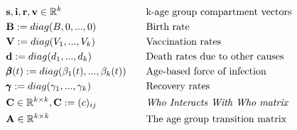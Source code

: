 \documentclass{article}
\theoremstyle{definition}
\begin{document}
\begin{align*}
&\mathbf{s}, \mathbf{i}, \mathbf{r} ,\mathbf{v}\in \mathbb{R}^k& \quad& \text{k-age group compartment vectors}\\
&\mathbf{B}:=diag(B,0,...,0)& \quad& \text{Birth rate}\\
&\mathbf{V}:=diag(V_1,...,V_k) &\quad& \text{Vaccination rates}\\
&\mathbf{d}:=diag(d_1,...,d_k) &\quad& \text{Death rates due to other causes}\\
&\pmb{\beta}(t):=diag(\beta_1(t),...,\beta_k(t))&\quad& \text{Age-based force of infection}\\
&\pmb{\gamma}:=diag(\gamma_1,...,\gamma_k)&\quad&\text{Recovery rates}\\
&\mathbf{C}\in \mathbb{R}^{k\times k}, \mathbf{C} := (c)_{ij} &\quad& \text{\emph{Who Interacts With Who matrix}}\\
&\mathbf{A}\in\mathbb{R}^{k\times k}&\quad& \text{The age group transition matrix}
\end{align*}
\end{document}
